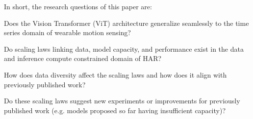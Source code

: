 In short, the research questions of this paper are:





\begin{mdframed}


 Does the Vision Transformer (ViT) architecture generalize seamlessly to the time series domain of wearable motion sensing?

 Do scaling laws linking data, model capacity, and performance exist in the data and inference compute constrained domain of HAR?

 How does data diversity affect the scaling laws and how does it align with previously published work?


 Do these scaling laws suggest new experiments or improvements for previously published work (e.g. models proposed so far having insufficient capacity)?
\end{mdframed}

